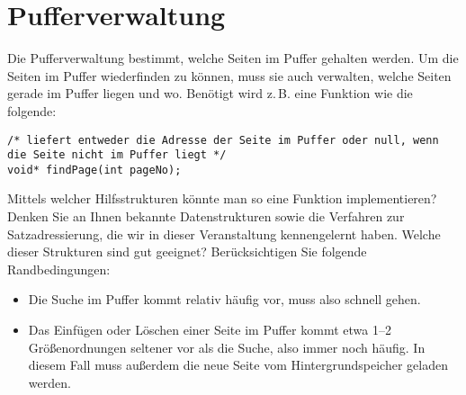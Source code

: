 \section{Pufferverwaltung}
Die Pufferverwaltung bestimmt, welche Seiten im Puffer gehalten werden. Um die Seiten im Puffer wiederfinden zu können, muss sie auch verwalten, welche Seiten gerade im Puffer liegen und wo. Benötigt wird z.\,B. eine Funktion wie die folgende:

\texttt{/* liefert entweder die Adresse der Seite im Puffer\beamertxt{\linebreak}
oder null, wenn die\normaltxt{\linebreak}
Seite nicht im Puffer liegt */\\
	void* findPage(int pageNo); }

Mittels welcher Hilfsstrukturen könnte man so eine Funktion implementieren? Denken Sie an Ihnen bekannte Datenstrukturen sowie die Verfahren zur Satzadressierung, die wir in dieser Veranstaltung kennengelernt haben. Welche dieser Strukturen sind gut geeignet? Berücksichtigen Sie folgende Randbedingungen:
\begin{itemize}
	\item Die Suche im Puffer kommt relativ häufig vor, muss also schnell gehen.
	\item Das Einfügen oder Löschen einer Seite im Puffer kommt etwa 1--2 Größenordnungen seltener vor als die Suche, also immer noch häufig. In diesem Fall muss außerdem die neue Seite vom Hintergrundspeicher geladen werden.
\end{itemize}

